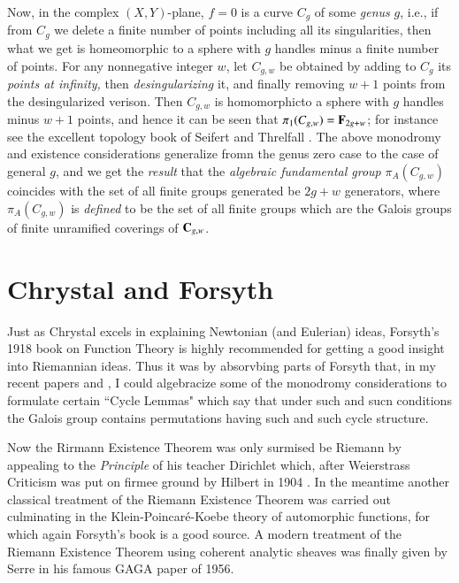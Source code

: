 Now, in the complex $(X, Y)$-plane, $f=0$ is a curve $C_{g}$ of some \textit{genus} $g$, i.e., if from $C_{g}$ we delete a finite number of points including all its singularities, then what we get is homeomorphic to a sphere with $g$ handles minus a finite number of points. For any nonnegative integer $w$, let $C_{g,w}$ be obtained by adding to $C_{g}$ its \textit{points at infinity,} then \textit{desingularizing} it, and finally removing $w+1$ points from the desingularized verison. Then $C_{g,w}$ is homomorphic\pageoriginale to a sphere with $g$ handles minus $w+1$ points, and hence it can be seen that $\pi_{1}(C_{g,w})=\mathbf{F}_{2g+w}$; for instance see the excellent topology book of Seifert and Threlfall \cite{chap1-key54}. The above monodromy and existence considerations generalize fromn the genus zero case to the case of general $g$, and we get the \textit{result} that the \textit{algebraic fundamental group} $\pi_{A}(C_{g,w})$ coincides with the set of all finite groups generated be $2g+w$ generators, where $\pi_{A}(C_{g,w})$ is \textit{defined} to be the set of all finite groups which are the Galois groups of finite unramified coverings of $\mathbf{C}_{g,w}$.\\[-1cm]

\section{Chrystal and Forsyth}\label{chap1-sec5}

Just as Chrystal excels in explaining Newtonian (and Eulerian) ideas, Forsyth's 1918 book on Function Theory \cite{chap1-key31} is highly recommended for getting a good insight into Riemannian ideas. Thus it was by absorvbing parts of Forsyth that, in my recent papers \cite{chap1-key8} and \cite{chap1-key10}, I could algebracize some of the monodromy considerations to formulate certain ``Cycle Lemmas" which say that under such and sucn conditions the Galois group contains permutations having such and such cycle structure.

Now the Rirmann Existence Theorem was only surmised be Riemann \cite{chap1-key52} by appealing to the \textit{Principle} of his teacher Dirichlet which, after Weierstrass Criticism was put on firmee ground by Hilbert in 1904 \cite{chap1-key35}. In the meantime another classical treatment of the Riemann Existence Theorem was carried out culminating in the Klein-Poincar\'e-Koebe theory of automorphic functions, for which again Forsyth's book is a good source. A modern treatment of the Riemann Existence Theorem using coherent analytic sheaves was finally given by Serre in his famous GAGA paper \cite{chap1-key55} of 1956.

